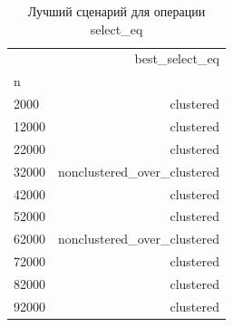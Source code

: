 \begin{table}
\caption{Лучший сценарий для операции select_eq}
\label{tab:best-select_eq}
\begin{tabular}{lr}
\toprule
 & best_select_eq \\
n &  \\
\midrule
2000 & clustered \\
12000 & clustered \\
22000 & clustered \\
32000 & nonclustered_over_clustered \\
42000 & clustered \\
52000 & clustered \\
62000 & nonclustered_over_clustered \\
72000 & clustered \\
82000 & clustered \\
92000 & clustered \\
\bottomrule
\end{tabular}
\end{table}
